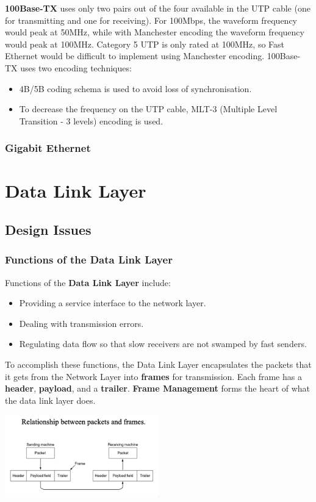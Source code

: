 \documentclass[11pt]{article}
\begin{document}
\textbf{100Base-TX} uses only two pairs out of the four available in the UTP cable (one for transmitting and one 
for receiving).
For 100Mbps, the waveform frequency would peak at 50MHz, while with Manchester encoding the waveform frequency 
would peak at 100MHz. 
Category 5 UTP is only rated at 100MHz, so Fast Ethernet would be difficult to implement using Manchester encoding.
100Base-TX uses two encoding techniques:
\begin{itemize}
    \item   4B/5B coding schema is used to avoid loss of synchronisation. 
    \item   To decrease the frequency on the UTP cable, MLT-3 (Multiple Level Transition - 3 levels) encoding is used.
\end{itemize}

\subsubsection{Gigabit Ethernet}

\section{Data Link Layer} 
\subsection{Design Issues}
\subsubsection{Functions of the Data Link Layer}
Functions of the \textbf{Data Link Layer} include:
\begin{itemize}
    \item   Providing a service interface to the network layer. 
    \item   Dealing with transmission errors. 
    \item   Regulating data flow so that slow receivers are not swamped by fast senders. 
\end{itemize}
 
To accomplish these functions, the Data Link Layer encapsulates the packets that it gets from the Network Layer into 
\textbf{frames} for transmission.
Each frame has a \textbf{header}, \textbf{payload}, and a \textbf{trailer}. 
\textbf{Frame Management} forms the heart of what the data link layer does.
\begin{center}
    \includegraphics[width=0.5\textwidth]{relationshipbetweenpacketsandframes.png}
\end{center}
\end{document}

